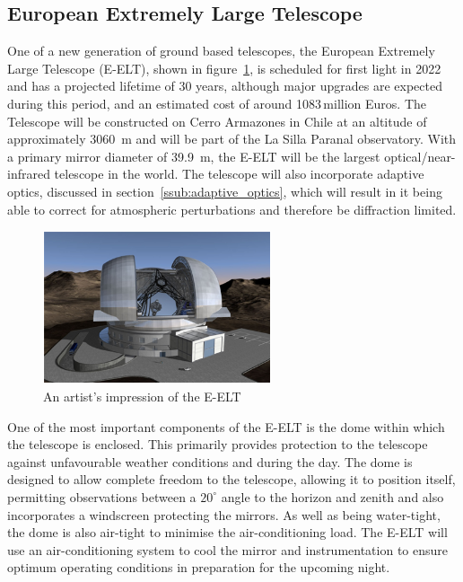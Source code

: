 
\subsection{European Extremely Large Telescope} %
\label{sub:european_extremely_large_telescope}
	One of a new generation of ground based telescopes, the European Extremely Large Telescope (E-ELT), shown in figure~\ref{fig:artist_eelt}, is scheduled for first light in 2022 and has a projected lifetime of 30 years, although major upgrades are expected during this period\cite[p.~163]{E_ELT_Construction_Proposal}, and an estimated cost of around 1083\,million Euros. The Telescope will be constructed on Cerro Armazones in Chile at an altitude of approximately \SI{3060}{\metre} and will be part of the La Silla Paranal observatory. With a primary mirror diameter of \SI{39.9}{\metre}, the E-ELT will be the largest optical/near-infrared telescope in the world. The telescope will also incorporate adaptive optics, discussed in section~\ref{ssub:adaptive_optics}, which will result in it being able to correct for atmospheric perturbations and therefore be diffraction limited.
	\begin{figure}[!htb]
		\centering
		\includegraphics[width=0.6\textwidth]{../Images/E-ELT.png}
		\caption{An artist's impression of the E-ELT\cite{E_ELT_Enclosure}}\label{fig:artist_eelt}
	\end{figure}

	One of the most important components of the E-ELT is the dome within which the telescope is enclosed. This primarily provides protection to the telescope against unfavourable weather conditions and during the day. The dome is designed to allow complete freedom to the telescope, allowing it to position itself, permitting observations between a $20^{\circ}$ angle to the horizon and zenith and also incorporates a windscreen protecting the mirrors. As well as being water-tight, the dome is also air-tight to minimise the air-conditioning load. The E-ELT will use an air-conditioning system to cool the mirror and instrumentation to ensure optimum operating conditions in preparation for the upcoming night.

